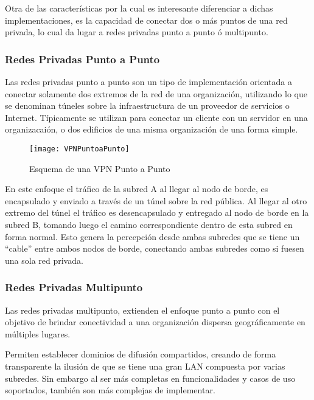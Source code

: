 Otra de las características por la cual es interesante diferenciar a dichas implementaciones, es la capacidad de conectar dos o m\'as puntos de una red privada, lo cual da lugar a redes privadas punto a punto \'o multipunto.

\subsubsection{Redes Privadas Punto a Punto}

Las redes privadas punto a punto son un tipo de implementaci\'on orientada a conectar solamente dos extremos de la red de una organizaci\'on, utilizando lo que se denominan t\'uneles sobre la infraestructura de un proveedor de servicios o Internet. T\'ipicamente se utilizan para conectar un cliente con un servidor en una organizacai\'on, o dos edificios de una misma organizaci\'on de una forma simple. 

\begin{figure}[htbp!] 
\centering    
\texttt{[image: VPNPuntoaPunto]}
\caption[Esquema de una VPN Punto a Punto]{Esquema de una VPN Punto a Punto}
\label{fig:VPNPuntoAPunto}
\end{figure}

En este enfoque el tr\'afico de la subred A al llegar al nodo de borde, es encapsulado y enviado a trav\'es de un túnel sobre la red p\'ublica. Al llegar al otro extremo del túnel el tr\'afico es desencapsulado y entregado al nodo de borde en la subred B, tomando luego el camino correspondiente dentro de esta subred en forma normal. Esto genera la percepci\'on desde ambas subredes que se tiene un “cable” entre ambos nodos de borde, conectando ambas subredes como si fuesen una sola red privada.
 
\subsubsection{Redes Privadas Multipunto}

Las redes privadas multipunto, extienden el enfoque punto a punto con el objetivo de brindar conectividad a una organizaci\'on dispersa geogr\'aficamente en m\'ultiples lugares.

Permiten establecer dominios de difusi\'on compartidos, creando de forma transparente la ilusi\'on de que se tiene una gran LAN compuesta por varias subredes. Sin embargo al ser m\'as completas en funcionalidades y casos de uso soportados, tambi\'en son m\'as complejas de implementar.\\ 

